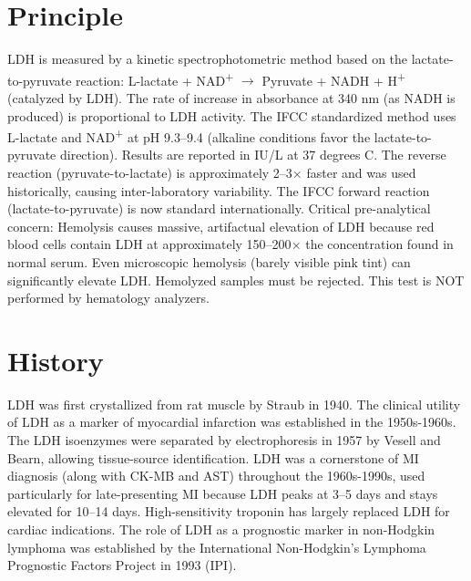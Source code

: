 \section*{Principle}
LDH is measured by a kinetic spectrophotometric method based on the lactate-to-pyruvate reaction: L-lactate + NAD\textsuperscript{+} $\rightarrow$ Pyruvate + NADH + H\textsuperscript{+} (catalyzed by LDH). The rate of increase in absorbance at 340 nm (as NADH is produced) is proportional to LDH activity. The IFCC standardized method uses L-lactate and NAD\textsuperscript{+} at pH 9.3--9.4 (alkaline conditions favor the lactate-to-pyruvate direction). Results are reported in IU/L at 37 degrees C. The reverse reaction (pyruvate-to-lactate) is approximately 2--3$\times$ faster and was used historically, causing inter-laboratory variability. The IFCC forward reaction (lactate-to-pyruvate) is now standard internationally. Critical pre-analytical concern: Hemolysis causes massive, artifactual elevation of LDH because red blood cells contain LDH at approximately 150--200$\times$ the concentration found in normal serum. Even microscopic hemolysis (barely visible pink tint) can significantly elevate LDH. Hemolyzed samples must be rejected. This test is NOT performed by hematology analyzers.

\section*{History}
LDH was first crystallized from rat muscle by Straub in 1940. The clinical utility of LDH as a marker of myocardial infarction was established in the 1950s-1960s. The LDH isoenzymes were separated by electrophoresis in 1957 by Vesell and Bearn, allowing tissue-source identification. LDH was a cornerstone of MI diagnosis (along with CK-MB and AST) throughout the 1960s-1990s, used particularly for late-presenting MI because LDH peaks at 3--5 days and stays elevated for 10--14 days. High-sensitivity troponin has largely replaced LDH for cardiac indications. The role of LDH as a prognostic marker in non-Hodgkin lymphoma was established by the International Non-Hodgkin's Lymphoma Prognostic Factors Project in 1993 (IPI).

